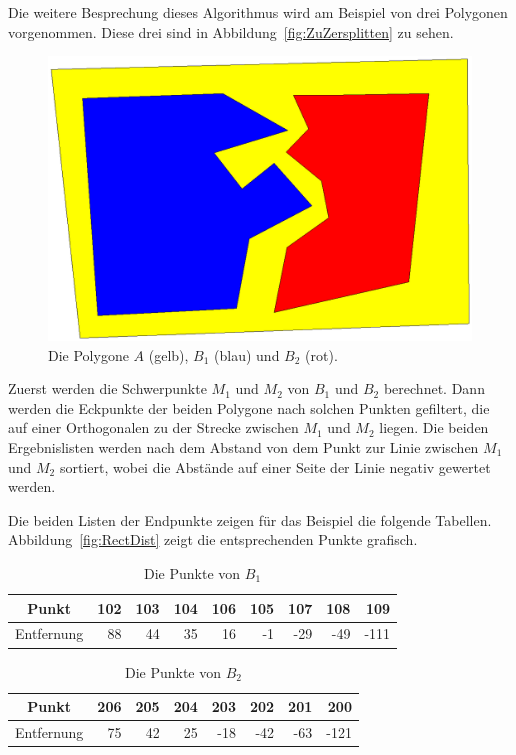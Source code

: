 Die weitere Besprechung dieses Algorithmus wird am Beispiel von drei Polygonen vorgenommen. Diese drei sind in Abbildung~\vref{fig:ZuZersplitten} zu sehen.

\begin{figure}
	\centering
	\includegraphics[scale=0.6]{ZuZersplitten.eps}
	\caption[Zu teilendes Polygon mit Referenzpolygonen]{Die Polygone $A$ (gelb), $B_1$ (blau) und $B_2$ (rot).}
	\label{fig:ZuZersplitten}
\end{figure}

Zuerst werden die Schwerpunkte $M_1$ und $M_2$  von $B_1$ und $B_2$ berechnet. Dann werden die Eckpunkte der beiden Polygone nach solchen Punkten gefiltert, die auf einer Orthogonalen zu der Strecke zwischen $M_1$ und $M_2$ liegen. Die beiden Ergebnislisten werden nach dem Abstand von dem Punkt zur Linie zwischen $M_1$ und $M_2$ sortiert, wobei die Abstände auf einer Seite der Linie negativ gewertet werden.

Die beiden Listen der Endpunkte zeigen für das Beispiel die folgende Tabellen. Abbildung~\vref{fig:RectDist} zeigt die entsprechenden Punkte grafisch.

\begin{table}[!h]
\begin{tabular}{|c|r|r|r|r|r|r|r|r|}
\hline
Punkt&
 102&
 103&
 104&
 106&
 105&
 107&
 108&
 109\\
\hline
Entfernung&
   88&
   44&
   35&
   16&
   -1&
  -29&
  -49&
 -111\\
\hline
\end{tabular} 
\caption{Die Punkte von $B_1$}
\end{table}
\begin{table}[!h]


\begin{tabular}{|c|r|r|r|r|r|r|r|}



\hline
Punkt&
 206&
 205&
 204&
 203&
 202&
 201&
 200
\\
\hline
Entfernung&
   75&
   42&
   25&
  -18&
  -42&
  -63&
 -121
\\
\hline
\end{tabular} 
\caption{Die Punkte von $B_2$}
\end{table}


